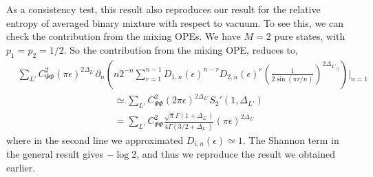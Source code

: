 \documentclass[11pt]{article}
\newcommand{\ep}{\epsilon}
\newcommand{\p}{\partial}
\newcommand{\nn}{\nonumber}
\newcommand{\lb}{\left(}
\newcommand{\rb}{\right)}
\begin{document}
As a consistency test, this result also reproduces our result for the relative entropy of averaged binary mixture with respect to vacuum. To see this, we can check the contribution from the mixing OPEs. We have $M=2$ pure states, with $p_1 = p_2 = 1/2$. So the contribution from the mixing OPE, reduces to,
\begin{align}
    &\sum_{L'}C_{\Psi \Phi}^2 (\pi \ep)^{2\Delta_{L'}}\p_n \lb n2^{-n}  \sum_{r=1}^{n-1}D_{1,n}(\ep)^{n-r}D_{2,n}(\ep)^r \lb\frac{1}{2\sin (\pi r/n)}\rb^{2\Delta_{L'_{ij}}}\rb\Bigg|_{n=1} \nn\\
    &\qquad\qquad\qquad\qquad \qquad\simeq\sum_{L'}C_{\Psi\Phi}^2 (2\pi \ep)^{2\Delta_{L'}} S_2'(1,\Delta_{L'}) \\
    &\qquad\qquad\qquad\qquad \qquad= \sum_{L'}C_{\Psi\Phi}^2\frac{\sqrt{\pi }\Gamma(1+\Delta_{L'})}{4\Gamma(3/2+\Delta_{L'})}(\pi \ep)^{2\Delta_{L'}}
\end{align}
where in the second line we approximated $D_{i,n}(\ep)\simeq 1$. 
The Shannon term in the general result gives $-\log 2$, and thus we reproduce the result we obtained earlier. 
\end{document}
